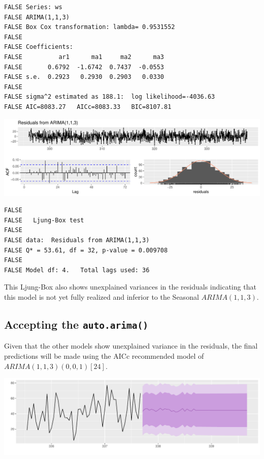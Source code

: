 \documentclass[openany]{book}
\begin{document}
\begin{verbatim}
FALSE Series: ws 
FALSE ARIMA(1,1,3) 
FALSE Box Cox transformation: lambda= 0.9531552 
FALSE 
FALSE Coefficients:
FALSE          ar1      ma1     ma2      ma3
FALSE       0.6792  -1.6742  0.7437  -0.0553
FALSE s.e.  0.2923   0.2930  0.2903   0.0330
FALSE 
FALSE sigma^2 estimated as 188.1:  log likelihood=-4036.63
FALSE AIC=8083.27   AICc=8083.33   BIC=8107.81
\end{verbatim}

\includegraphics{Group2_Project1_Fall2019_files/figure-latex/unnamed-chunk-28-1.pdf}

\begin{verbatim}
FALSE 
FALSE   Ljung-Box test
FALSE 
FALSE data:  Residuals from ARIMA(1,1,3)
FALSE Q* = 53.61, df = 32, p-value = 0.009708
FALSE 
FALSE Model df: 4.   Total lags used: 36
\end{verbatim}

This Ljung-Box also shows unexplained variances in the residuals
indicating that this model is not yet fully realized and inferior to the
Seasonal \(ARIMA (1,1,3)\).

\hypertarget{accepting-the-auto.arima}{%
\subsection{\texorpdfstring{Accepting the
\texttt{auto.arima()}}{Accepting the auto.arima()}}\label{accepting-the-auto.arima}}

Given that the other models show unexplained variance in the residuals,
the final predictions will be made using the AICc recommended model of
\(ARIMA (1,1,3)(0,0,1)[24]\).

\includegraphics{Group2_Project1_Fall2019_files/figure-latex/unnamed-chunk-29-1.pdf}
\end{document}
